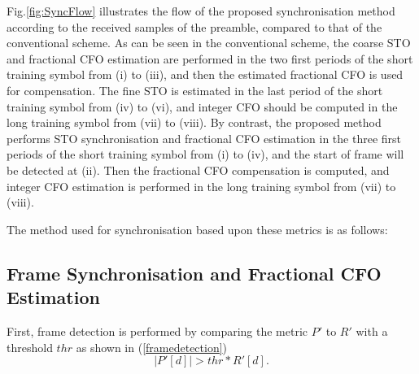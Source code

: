 Fig.\ref{fig:SyncFlow} illustrates the flow of the proposed synchronisation method according to the received samples of the preamble, compared to that of the conventional scheme.
As can be seen in the conventional scheme, the coarse STO and fractional CFO estimation are performed in the two first periods of the short training symbol from (i) to (iii), and then the estimated fractional CFO is used for compensation. 
The fine STO is estimated in the last period of the short training symbol from (iv) to (vi), and integer CFO should be computed in the long training symbol from (vii) to (viii).
By contrast, the proposed method performs STO synchronisation and fractional CFO estimation in the three first periods of the short training symbol from (i) to (iv), and the start of frame will be detected at (ii).
Then the fractional CFO compensation is computed, and integer CFO estimation is performed in the long training symbol from (vii) to (viii).

The method used for synchronisation based upon these metrics is as follows:

\subsection{Frame Synchronisation and Fractional CFO Estimation}

First, frame detection is performed by comparing the metric $P'$ to $R'$ with a threshold $thr$ as shown in (\ref{framedetection})
\begin{equation}
\label{framedetection}
|P'[d]| > thr * R'[d].
\end{equation} 


